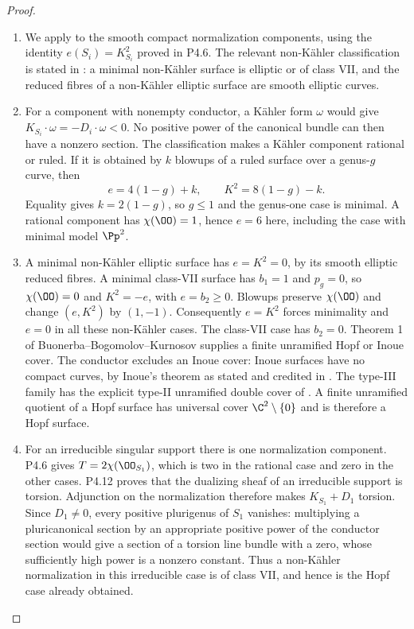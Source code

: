 \begin{proof}

\begin{enumerate}[label={$\langle1\rangle$\arabic*.},leftmargin=*]
\item We apply \cite[Chapter~VI, Theorem~1.1 and Table~10, pp.~243--244]{BHPV2004E} to the smooth compact
normalization components, using the identity $e(S_i)=K_{S_i}^2$ proved
in P4.6. The relevant non-Kähler classification is stated in
\cite[Theorem~4.2 and proof, pp.~17--21; Theorem~5.1 and proof, pp.~27--29]{OVV2020}: a minimal non-Kähler
surface is elliptic or of class VII, and the reduced fibres of a
non-Kähler elliptic surface are smooth elliptic curves.

\item For a component with nonempty conductor, a Kähler form $\omega$ would
give $K_{S_i}\cdot\omega=-D_i\cdot\omega<0$. No positive power of
the canonical bundle can then have a nonzero section. The classification
makes a Kähler component rational or ruled. If it is obtained by $k$
blowups of a ruled surface over a genus-$g$ curve, then
\[
 e=4(1-g)+k,\qquad K^2=8(1-g)-k.
\]
Equality gives $k=2(1-g)$, so $g\le1$ and the genus-one case is minimal.
A rational component has $\chi(\OO)=1$, hence $e=6$ here, including
the case with minimal model $\Pp^2$.

\item A minimal non-Kähler elliptic surface has $e=K^2=0$, by its smooth
elliptic reduced fibres. A minimal class-VII surface has $b_1=1$ and
$p_g=0$, so $\chi(\OO)=0$ and $K^2=-e$, with $e=b_2\ge0$.
Blowups preserve $\chi(\OO)$ and change $(e,K^2)$ by $(1,-1)$.
Consequently $e=K^2$ forces minimality and $e=0$ in all these
non-Kähler cases. The class-VII case has $b_2=0$. Theorem 1 of
Buonerba--Bogomolov--Kurnosov \cite[Theorem~1, p.~1]{BBK2019} supplies a finite unramified Hopf or
Inoue cover. The conductor excludes an Inoue cover: Inoue surfaces
have no compact curves, by Inoue's theorem as stated and credited in
\cite[Theorem~3.1, p.~303]{KhaledTeleman2026Journal}.
The type-III family has the explicit type-II unramified double cover
of \cite[proof of Remark~3.5, p.~305]{KhaledTeleman2026Journal}. A finite unramified quotient of a Hopf surface has universal
cover $\C^2\setminus\{0\}$ and is therefore a Hopf surface.

\item For an irreducible singular support there is one normalization
component. P4.6 gives $T=2\chi(\OO_{S_1})$, which is two in the
rational case and zero in the other cases. P4.12 proves that the
dualizing sheaf of an irreducible support is torsion. Adjunction on
the normalization therefore makes $K_{S_1}+D_1$ torsion. Since
$D_1\ne0$, every positive plurigenus of $S_1$ vanishes: multiplying
a pluricanonical section by an appropriate positive power of the
conductor section would give a section of a torsion line bundle with
a zero, whose sufficiently high power is a nonzero constant. Thus a
non-Kähler normalization in this irreducible case is of class VII,
and hence is the Hopf case already obtained.


\end{enumerate}
\end{proof}
